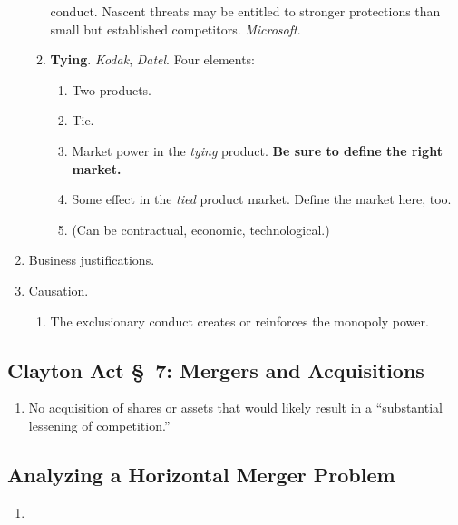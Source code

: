 \begin{enumerate}
\begin{enumerate}
        conduct. Nascent threats may be entitled to stronger protections than 
        small but established competitors. \emph{Microsoft}.
        \item \textbf{Tying}. \emph{Kodak}, \emph{Datel}. Four elements:
        \begin{enumerate}
            \item Two products.
            \item Tie.
            \item Market power in the \emph{tying} product. \textbf{Be sure to 
            define the right market.}
            \item Some effect in the \emph{tied} product market. Define the 
            market here, too.
            \item (Can be contractual, economic,  technological.)
        \end{enumerate}
    \end{enumerate}
    \item Business justifications.
    \item Causation.
    \begin{enumerate}
        \item The exclusionary conduct creates or reinforces the monopoly 
        power.
    \end{enumerate}
\end{enumerate}

\subsection{Clayton Act \S\ 7: Mergers and Acquisitions}

\begin{enumerate}
    \item No acquisition of shares or assets that would likely result in a 
    ``substantial lessening of competition.''
\end{enumerate}

\subsection{Analyzing a Horizontal Merger Problem}

\begin{enumerate}
    \item %
\end{enumerate}
